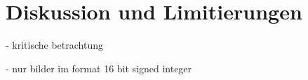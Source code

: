 \chapter{Diskussion und Limitierungen}
\label{chap:diskussion} - kritische betrachtung

- nur bilder im format 16 bit signed integer